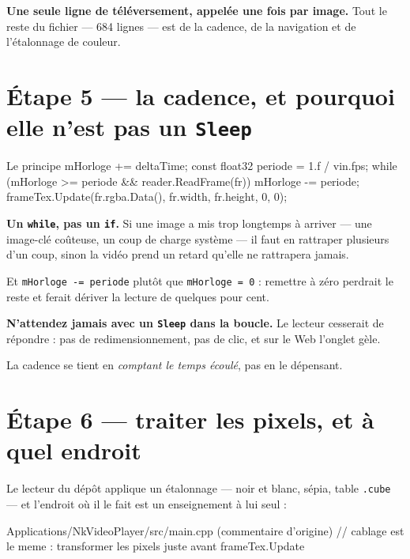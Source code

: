 \begin{nkretenir}
\textbf{Une seule ligne de téléversement, appelée une fois par image.} Tout le
reste du fichier --- 684 lignes --- est de la cadence, de la navigation et de
l'étalonnage de couleur.
\end{nkretenir}

\section{Étape 5 --- la cadence, et pourquoi elle n'est pas un \texttt{Sleep}}

\begin{nkcode}{Le principe}
mHorloge += deltaTime;
const float32 periode = 1.f / vin.fps;
while (mHorloge >= periode && reader.ReadFrame(fr)) {
    mHorloge -= periode;
    frameTex.Update(fr.rgba.Data(), fr.width, fr.height, 0, 0);
}
\end{nkcode}

\begin{nkretenir}
\textbf{Un \texttt{while}, pas un \texttt{if}.} Si une image a mis trop longtemps
à arriver --- une image-clé coûteuse, un coup de charge système --- il faut en
rattraper plusieurs d'un coup, sinon la vidéo prend un retard qu'elle ne
rattrapera jamais.

Et \texttt{mHorloge -= periode} plutôt que \texttt{mHorloge = 0} : remettre à
zéro perdrait le reste et ferait dériver la lecture de quelques pour cent.
\end{nkretenir}

\begin{nkpiege}
\textbf{N'attendez jamais avec un \texttt{Sleep} dans la boucle.} Le lecteur
cesserait de répondre : pas de redimensionnement, pas de clic, et sur le Web
l'onglet gèle.

La cadence se tient en \emph{comptant le temps écoulé}, pas en le dépensant.
\end{nkpiege}

\section{Étape 6 --- traiter les pixels, et à quel endroit}

Le lecteur du dépôt applique un étalonnage --- noir et blanc, sépia, table
\texttt{.cube} --- et l'endroit où il le fait est un enseignement à lui seul :

\begin{nkcode}{Applications/NkVideoPlayer/src/main.cpp (commentaire d'origine)}
// cablage est le meme : transformer les pixels juste avant frameTex.Update
\end{nkcode}

